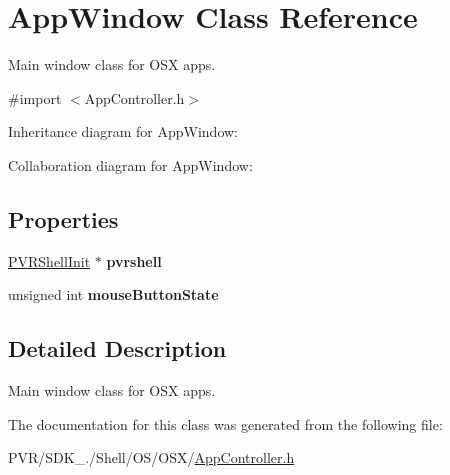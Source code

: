 \hypertarget{interface_app_window}{\section{App\+Window Class Reference}
\label{interface_app_window}
}


Main window class for O\+S\+X apps.  




{\ttfamily \#import $<$App\+Controller.\+h$>$}



Inheritance diagram for App\+Window\+:


Collaboration diagram for App\+Window\+:
\subsection*{Properties}
\begin{DoxyCompactItemize}
\item 
\hypertarget{interface_app_window_a4df4042016a4e2dc6b6f30abd0f59b97}{\hyperlink{class_p_v_r_shell_init}{P\+V\+R\+Shell\+Init} $\ast$ {\bfseries pvrshell}}\label{interface_app_window_a4df4042016a4e2dc6b6f30abd0f59b97}

\item 
\hypertarget{interface_app_window_aecf11cc5c466a0c2efccf822bbf92ab2}{unsigned int {\bfseries mouse\+Button\+State}}\label{interface_app_window_aecf11cc5c466a0c2efccf822bbf92ab2}

\end{DoxyCompactItemize}


\subsection{Detailed Description}
Main window class for O\+S\+X apps. 



 

The documentation for this class was generated from the following file\+:\begin{DoxyCompactItemize}
\item 
P\+V\+R/\+S\+D\+K\+\_./\+Shell/\+O\+S/\+O\+S\+X/\hyperlink{_o_s_x_2_app_controller_8h}{App\+Controller.\+h}\end{DoxyCompactItemize}
